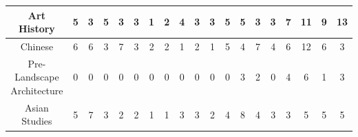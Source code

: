 \documentclass[10]{article}
\begin{document}
\begin{landscape}
\begin{longtable}[c]{|ccccccccccccccccccc|}
	\multicolumn{1}{|c|}{Art History}                                & \multicolumn{1}{c|}{5}          & \multicolumn{1}{c|}{3}          & \multicolumn{1}{c|}{5}          & \multicolumn{1}{c|}{3}          & \multicolumn{1}{c|}{3}          & \multicolumn{1}{c|}{1}          & \multicolumn{1}{c|}{2}          & \multicolumn{1}{c|}{4}          & \multicolumn{1}{c|}{3}          & \multicolumn{1}{c|}{3}          & \multicolumn{1}{c|}{5}          & \multicolumn{1}{c|}{5}          & \multicolumn{1}{c|}{3}          & \multicolumn{1}{c|}{3}          & \multicolumn{1}{c|}{7}          & \multicolumn{1}{c|}{11}         & \multicolumn{1}{c|}{9}          & 13         \\ \hline
	\multicolumn{1}{|c|}{Chinese}                                    & \multicolumn{1}{c|}{6}          & \multicolumn{1}{c|}{6}          & \multicolumn{1}{c|}{3}          & \multicolumn{1}{c|}{7}          & \multicolumn{1}{c|}{3}          & \multicolumn{1}{c|}{2}          & \multicolumn{1}{c|}{2}          & \multicolumn{1}{c|}{1}          & \multicolumn{1}{c|}{2}          & \multicolumn{1}{c|}{1}          & \multicolumn{1}{c|}{5}          & \multicolumn{1}{c|}{4}          & \multicolumn{1}{c|}{7}          & \multicolumn{1}{c|}{4}          & \multicolumn{1}{c|}{6}          & \multicolumn{1}{c|}{12}         & \multicolumn{1}{c|}{6}          & 3          \\ \hline
	\multicolumn{1}{|c|}{Pre-Landscape Architecture}                 & \multicolumn{1}{c|}{0}          & \multicolumn{1}{c|}{0}          & \multicolumn{1}{c|}{0}          & \multicolumn{1}{c|}{0}          & \multicolumn{1}{c|}{0}          & \multicolumn{1}{c|}{0}          & \multicolumn{1}{c|}{0}          & \multicolumn{1}{c|}{0}          & \multicolumn{1}{c|}{0}          & \multicolumn{1}{c|}{0}          & \multicolumn{1}{c|}{0}          & \multicolumn{1}{c|}{3}          & \multicolumn{1}{c|}{2}          & \multicolumn{1}{c|}{0}          & \multicolumn{1}{c|}{4}          & \multicolumn{1}{c|}{6}          & \multicolumn{1}{c|}{1}          & 3          \\ \hline
	\multicolumn{1}{|c|}{Asian Studies}                              & \multicolumn{1}{c|}{5}          & \multicolumn{1}{c|}{7}          & \multicolumn{1}{c|}{3}          & \multicolumn{1}{c|}{2}          & \multicolumn{1}{c|}{2}          & \multicolumn{1}{c|}{1}          & \multicolumn{1}{c|}{1}          & \multicolumn{1}{c|}{3}          & \multicolumn{1}{c|}{3}          & \multicolumn{1}{c|}{2}          & \multicolumn{1}{c|}{4}          & \multicolumn{1}{c|}{8}          & \multicolumn{1}{c|}{4}          & \multicolumn{1}{c|}{3}          & \multicolumn{1}{c|}{3}          & \multicolumn{1}{c|}{5}          & \multicolumn{1}{c|}{5}          & 5          \\ \hline

\end{longtable}
\end{landscape}
\end{document}
